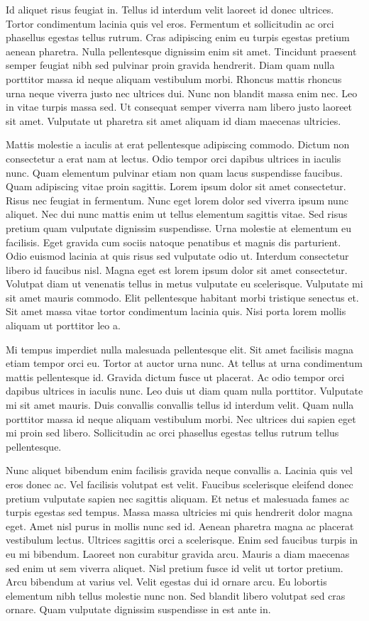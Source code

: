 \documentclass[11pt,a4paper,openright,twoside,onecolumn]{memoir}
\begin{document}
Id aliquet risus feugiat in. Tellus id interdum velit laoreet id donec
ultrices. Tortor condimentum lacinia quis vel eros. Fermentum et
sollicitudin ac orci phasellus egestas tellus rutrum. Cras adipiscing
enim eu turpis egestas pretium aenean pharetra. Nulla pellentesque
dignissim enim sit amet. Tincidunt praesent semper feugiat nibh sed
pulvinar proin gravida hendrerit. Diam quam nulla porttitor massa id
neque aliquam vestibulum morbi. Rhoncus mattis rhoncus urna neque
viverra justo nec ultrices dui. Nunc non blandit massa enim nec. Leo in
vitae turpis massa sed. Ut consequat semper viverra nam libero justo
laoreet sit amet. Vulputate ut pharetra sit amet aliquam id diam
maecenas ultricies.

Mattis molestie a iaculis at erat pellentesque adipiscing commodo.
Dictum non consectetur a erat nam at lectus. Odio tempor orci dapibus
ultrices in iaculis nunc. Quam elementum pulvinar etiam non quam lacus
suspendisse faucibus. Quam adipiscing vitae proin sagittis. Lorem ipsum
dolor sit amet consectetur. Risus nec feugiat in fermentum. Nunc eget
lorem dolor sed viverra ipsum nunc aliquet. Nec dui nunc mattis enim ut
tellus elementum sagittis vitae. Sed risus pretium quam vulputate
dignissim suspendisse. Urna molestie at elementum eu facilisis. Eget
gravida cum sociis natoque penatibus et magnis dis parturient. Odio
euismod lacinia at quis risus sed vulputate odio ut. Interdum
consectetur libero id faucibus nisl. Magna eget est lorem ipsum dolor
sit amet consectetur. Volutpat diam ut venenatis tellus in metus
vulputate eu scelerisque. Vulputate mi sit amet mauris commodo. Elit
pellentesque habitant morbi tristique senectus et. Sit amet massa vitae
tortor condimentum lacinia quis. Nisi porta lorem mollis aliquam ut
porttitor leo a.

Mi tempus imperdiet nulla malesuada pellentesque elit. Sit amet
facilisis magna etiam tempor orci eu. Tortor at auctor urna nunc. At
tellus at urna condimentum mattis pellentesque id. Gravida dictum fusce
ut placerat. Ac odio tempor orci dapibus ultrices in iaculis nunc. Leo
duis ut diam quam nulla porttitor. Vulputate mi sit amet mauris. Duis
convallis convallis tellus id interdum velit. Quam nulla porttitor massa
id neque aliquam vestibulum morbi. Nec ultrices dui sapien eget mi proin
sed libero. Sollicitudin ac orci phasellus egestas tellus rutrum tellus
pellentesque.

Nunc aliquet bibendum enim facilisis gravida neque convallis a. Lacinia
quis vel eros donec ac. Vel facilisis volutpat est velit. Faucibus
scelerisque eleifend donec pretium vulputate sapien nec sagittis
aliquam. Et netus et malesuada fames ac turpis egestas sed tempus. Massa
massa ultricies mi quis hendrerit dolor magna eget. Amet nisl purus in
mollis nunc sed id. Aenean pharetra magna ac placerat vestibulum lectus.
Ultrices sagittis orci a scelerisque. Enim sed faucibus turpis in eu mi
bibendum. Laoreet non curabitur gravida arcu. Mauris a diam maecenas sed
enim ut sem viverra aliquet. Nisl pretium fusce id velit ut tortor
pretium. Arcu bibendum at varius vel. Velit egestas dui id ornare arcu.
Eu lobortis elementum nibh tellus molestie nunc non. Sed blandit libero
volutpat sed cras ornare. Quam vulputate dignissim suspendisse in est
ante in.
\end{document}
